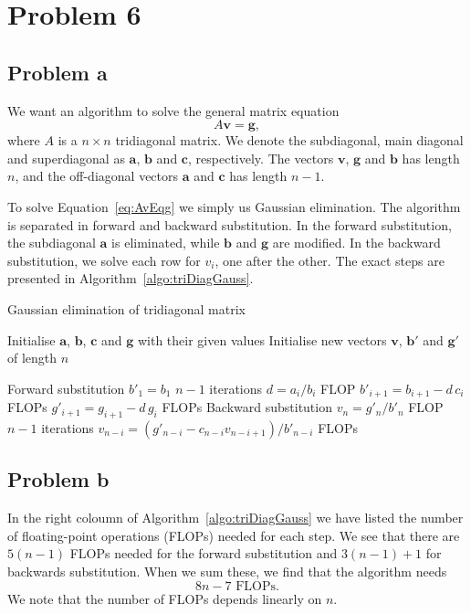 \documentclass[english,notitlepage,aps,pra,10pt]{revtex4-1}  %
\newcommand{\bv}[1]{\mathbf{#1}}
\begin{document}
\section*{Problem 6}
\subsection*{Problem a}
We want an algorithm to solve the general matrix equation 
\begin{equation}
    A \bv{v} = \bv{g},
    \label{eq:AvEqg}
\end{equation}
where $A$ is a $n \times n$ tridiagonal matrix. We denote the subdiagonal, main diagonal and superdiagonal as $\bv{a}$, $\bv{b}$ and $\bv{c}$, respectively. The vectors $\bv{v}$, $\bv{g}$ and $\bv{b}$ has length $n$, and the off-diagonal vectors $\bv{a}$ and $\bv{c}$ has length $n-1$. 

To solve Equation~\ref{eq:AvEqg} we simply us Gaussian elimination. The algorithm is separated in forward and backward substitution. In the forward substitution, the subdiagonal $\bv{a}$ is eliminated, while $\bv{b}$ and $\bv{g}$ are modified. In the backward substitution, we solve each row for $v_i$, one after the other. The exact steps are presented in Algorithm~\ref{algo:triDiagGauss}.

\begin{algorithm}[H]
    \caption{Gaussian elimination of tridiagonal matrix}\label{algo:triDiagGauss}
    \begin{algorithmic}
        \State Initialise $\bv{a}$, $\bv{b}$, $\bv{c}$ and $\bv{g}$ with their given values
        \State Initialise new vectors $\bv{v}$, $\bv{b}'$ and $\bv{g}'$ of length $n$ 

        \Comment Forward substitution
        \State $b'_1 = b_1$
                        \Comment $n-1$ iterations
            \State $d = a_i/b_i$                     FLOP
            \State $b'_{i+1} = b_{i+1} - d\, c_i$    FLOPs 
            \State $g'_{i+1} = g_{i+1} - d\, g_i$    FLOPs 
        \EndFor
        \Comment Backward substitution
        \State $v_n = g'_n/b'_n$                     FLOP 
                        \Comment $n-1$ iterations
            \State $v_{n-i} = (g'_{n-i} - c_{n-i} v_{n-i+1})/b'_{n-i}$   FLOPs
        \EndFor
    \end{algorithmic}
\end{algorithm}

\subsection*{Problem b}

In the right coloumn of Algorithm~\ref{algo:triDiagGauss} we have listed the number of floating-point operations (FLOPs) needed for each step. We see that there are $5(n-1)$ FLOPs needed for the forward substitution and $3(n-1)+1$ for backwards substitution. When we sum these, we find that the algorithm needs
\begin{equation}
    8n-7 \textrm{ FLOPs}.
\end{equation} 
We note that the number of FLOPs depends linearly on $n$.
\end{document}
